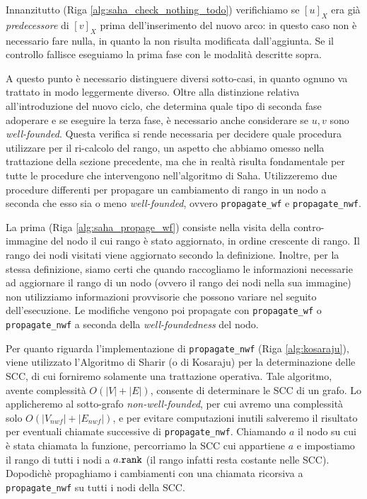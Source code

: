 Innanzitutto (Riga \ref{alg:saha_check_nothing_todo}) verifichiamo se $[u]_X$ era già \emph{predecessore} di $[v]_X$ prima dell'inserimento del nuovo arco: in questo caso non è necessario fare nulla, in quanto la \rscp non risulta modificata dall'aggiunta. Se il controllo fallisce eseguiamo la prima fase con le modalità descritte sopra.

A questo punto è necessario distinguere diversi sotto-casi, in quanto ognuno va trattato in modo leggermente diverso. Oltre alla distinzione relativa all'introduzione del nuovo ciclo, che determina quale tipo di seconda fase adoperare e se eseguire la terza fase, è necessario anche considerare se $u,v$ sono \emph{well-founded}. Questa verifica si rende necessaria per decidere quale procedura utilizzare per il ri-calcolo del rango, un aspetto che abbiamo omesso nella trattazione della sezione precedente, ma che in realtà risulta fondamentale per tutte le procedure che intervengono nell'algoritmo di Saha. Utilizzeremo due procedure differenti per propagare un cambiamento di rango in un nodo a seconda che esso sia o meno \emph{well-founded}, ovvero \texttt{propagate\_wf} e \texttt{propagate\_nwf}.

La prima (Riga \ref{alg:saha_propage_wf}) consiste nella visita della contro-immagine del nodo il cui rango è stato aggiornato, in ordine crescente di rango. Il rango dei nodi visitati viene aggiornato secondo la definizione. Inoltre, per la stessa definizione, siamo certi che quando raccogliamo le informazioni necessarie ad aggiornare il rango di un nodo (ovvero il rango dei nodi nella sua immagine) non utilizziamo informazioni provvisorie che possono variare nel seguito dell'esecuzione. Le modifiche vengono poi propagate con \texttt{propagate\_wf} o \texttt{propagate\_nwf} a seconda della \emph{well-foundedness} del nodo.

Per quanto riguarda l'implementazione di \texttt{propagate\_nwf} (Riga \ref{alg:kosaraju}), viene utilizzato l'Algoritmo di Sharir (o di Kosaraju) \cite{sharir} per la determinazione delle SCC, di cui forniremo solamente una trattazione operativa. Tale algoritmo, avente complessità $O(|V| + |E|)$, consente di determinare le SCC di un grafo. Lo applicheremo al sotto-grafo \emph{non-well-founded}, per cui avremo una complessità solo $O(|V_{nwf}| + |E_{nwf}|)$, e per evitare computazioni inutili salveremo il risultato per eventuali chiamate successive di \texttt{propagate\_nwf}. Chiamando $a$ il nodo su cui è stata chiamata la funzione, percorriamo la SCC cui appartiene $a$ e impostiamo il rango di tutti i nodi a $a.\texttt{\textup{rank}}$ (il rango infatti resta costante nelle SCC). Dopodichè propaghiamo i cambiamenti con una chiamata ricorsiva a \texttt{propagate\_nwf} su tutti i nodi della SCC.

